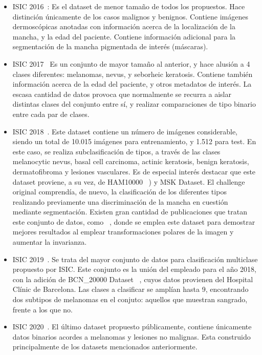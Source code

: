 \begin{itemize}
	
	\item ISIC 2016~\cite{gutman2016skin}:  Es el dataset de menor tamaño de todos los propuestos. Hace distinción únicamente de los casos malignos y benignos. Contiene imágenes dermoscópicas anotadas con información acerca de la localización de la mancha, y la edad del paciente. Contiene información adicional para la segmentación de la mancha pigmentada de interés (máscaras).
	\item ISIC 2017~\cite{codella2018skin} Es un conjunto de mayor tamaño al anterior, y hace alusión a 4 clases diferentes: melanomas, nevus, y seborheic keratosis. Contiene también información acerca de la edad del paciente, y otros metadatos de interés. La escasa cantidad de datos provoca que normalmente se recurra a aislar distintas clases del conjunto entre sí, y realizar comparaciones de tipo binario entre cada par de clases.
	\item ISIC 2018~\cite{ham10000,codella2018skin,combalia2019bcn20000}. Este dataset contiene un número de imágenes considerable, siendo un total de 10.015 imágenes para entrenamiento, y 1.512 para test. En este caso, se realiza subclasificación de tipos, a través de las clases melanocytic nevus, basal cell carcinoma, actinic keratosis, benign keratosis, dermatofibroma y lesiones vasculares. Es de especial interés destacar que este dataset proviene, a su vez, de HAM10000~\cite{ham10000} )  y MSK Dataset. El challenge original comprendía, de nuevo, la clasificación de los diferentes tipos realizando previamente una discriminación de la mancha en cuestión mediante segmentación. Existen gran cantidad de publicaciones que tratan este conjunto de datos, como ~\cite{benvcevic2021training}, donde se emplea este dataset para demostrar mejores resultados al emplear transformaciones polares de la imagen y aumentar la invarianza.
	
	\item ISIC 2019~\cite{ham10000,codella2018skin,combalia2019bcn20000}.  Se trata del mayor conjunto de datos para clasificación multiclase propuesto por ISIC. Este conjunto es la unión del empleado para el año 2018, con la adición de BCN\_20000 Dataset ~\cite{combalia2019bcn20000}, cuyos datos provienen del Hospital Clínic de Barcelona. Las clases a clasificar se amplían hasta 9, encontrando dos subtipos de melanomas en el conjuto: aquellos que muestran sangrado, frente a los que no.
	\item ISIC 2020~\cite{Rotemberg_2021}. El último dataset propuesto públicamente, contiene únicamente datos binarios acordes a melanomas y lesiones no malignas. Esta construido principalmente de los datasets mencionados anteriormente.
\end{itemize}

